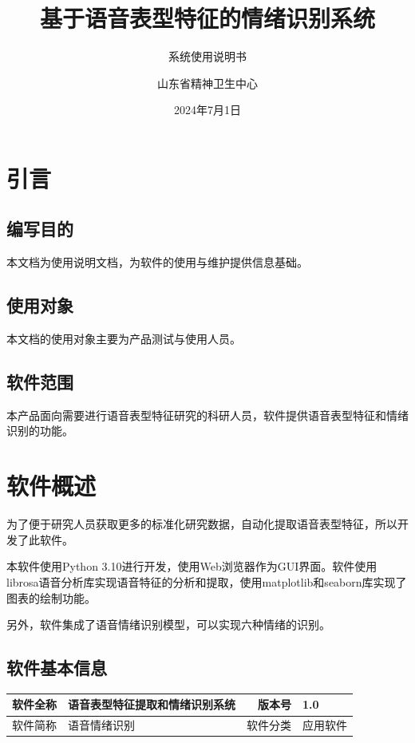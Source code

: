 \documentclass[lang=cn,newtx,12pt,scheme=chinese]{elegantbook}
\title{基于语音表型特征的情绪识别系统}
\subtitle{系统使用说明书}
\author{山东省精神卫生中心}
\date{2024年7月1日}
\begin{document}
\maketitle
\frontmatter

\tableofcontents

\mainmatter

\chapter{引言}
\section{编写目的}

本文档为使用说明文档，为软件的使用与维护提供信息基础。

\section{使用对象}

本文档的使用对象主要为产品测试与使用人员。

\section{软件范围}

本产品面向需要进行语音表型特征研究的科研人员，软件提供语音表型特征和情绪识别的功能。

\chapter{软件概述}

为了便于研究人员获取更多的标准化研究数据，自动化提取语音表型特征，所以开发了此软件。

本软件使用Python 3.10进行开发，使用Web浏览器作为GUI界面。软件使用librosa语音分析库实现语音特征的分析和提取，使用matplotlib和seaborn库实现了图表的绘制功能。

另外，软件集成了语音情绪识别模型，可以实现六种情绪的识别。

\section{软件基本信息}

\begin{tabular}{|r|l|r|l|}
  \hline
 软件全称	& 语音表型特征提取和情绪识别系统 & 版本号 & 1.0 \\
  \hline
软件简称  & 语音情绪识别 & 软件分类 & 应用软件\\
  \hline
\end{tabular}
\end{document}
